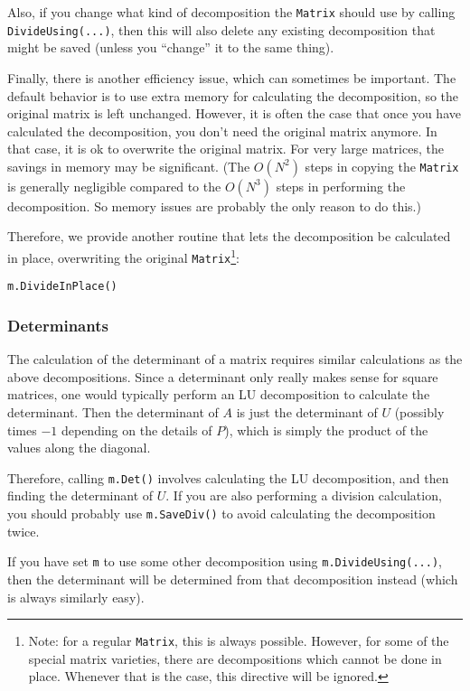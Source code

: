 \documentclass[twoside,letterpaper,11pt]{article}
\renewcommand{\tt}[1]{{\texttt {#1}}}
\begin{document}
Also, if you change what kind of decomposition the \tt{Matrix} should use by calling
\tt{DivideUsing(...)}, then this will also delete any existing decomposition that 
might be saved (unless you ``change'' it to the same thing).

Finally, there is another efficiency issue, which can sometimes be important.  The default
behavior is to use extra memory for calculating the decomposition, so the original
matrix is left unchanged.  However, it is often the case that once you have 
calculated the decomposition, you don't need the original matrix anymore.
In that case, it is ok to overwrite the original matrix.  For very large matrices, 
the savings in memory may be significant.  (The $O(N^2)$ steps in copying 
the \tt{Matrix} is generally negligible compared to the $O(N^3)$ steps in performing
the decomposition.  So memory issues are probably the only reason to do this.)

Therefore, we provide another routine that lets the decomposition be 
calculated in place, overwriting the original \tt{Matrix}\footnote{
Note: for a regular \tt{Matrix}, this is always possible.  However, for some of the 
special matrix varieties, there are decompositions which cannot be done in place.
Whenever that is the case, this directive will be ignored.}:
\begin{verbatim}
m.DivideInPlace()
\end{verbatim}

\subsubsection{Determinants}
\label{determinants}

The calculation of the determinant of a matrix requires similar calculations as
the above decompositions.  Since a determinant only really makes sense
for square matrices, one would typically perform an LU decomposition to calculate
the determinant.  Then the determinant of $A$ is just the determinant of $U$
(possibly times $-1$ depending on the details of $P$), which is simply the 
product of the values along the diagonal.

Therefore, calling \tt{m.Det()} involves calculating the LU decomposition, and then
finding the determinant of $U$.  
If you are also performing a division calculation, you should probably use
\tt{m.SaveDiv()} to avoid calculating the decomposition twice.

If you have set \tt{m} to use some other decomposition using 
\tt{m.DivideUsing(...)},
then the determinant will be determined from that decomposition instead 
(which is always similarly easy).
\end{document}
